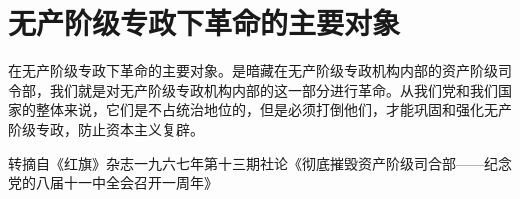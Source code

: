 \section[无产阶级专政下革命的主要对象（一九六七年八月）]{无产阶级专政下革命的主要对象}


在无产阶级专政下革命的主要对象。是暗藏在无产阶级专政机构内部的资产阶级司令部，我们就是对无产阶级专政机构内部的这一部分进行革命。从我们党和我们国家的整体来说，它们是不占统治地位的，但是必须打倒他们，才能巩固和强化无产阶级专政，防止资本主义复辟。

{\raggedleft 转摘自《红旗》杂志一九六七年第十三期社论《彻底摧毁资产阶级司合部——纪念党的八届十一中全会召开一周年》\par}


